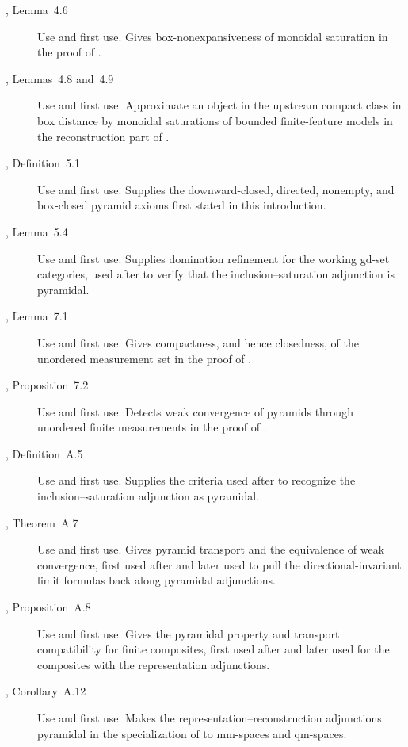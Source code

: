 \documentclass{amsart}
\theoremstyle{plain}
\theoremstyle{definition}
\theoremstyle{remark}
\begin{document}
\begin{description}
\item[\cite{gds2}, Lemma~4.6]
\textup{Use and first use.} Gives box-nonexpansiveness of monoidal saturation
in the proof of .

\item[\cite{gds2}, Lemmas~4.8 and~4.9]
\textup{Use and first use.} Approximate an object in the upstream compact
class in box distance by monoidal saturations of bounded finite-feature
models in the reconstruction part of
.

\item[\cite{gds2}, Definition~5.1]
\textup{Use and first use.} Supplies the downward-closed, directed,
nonempty, and box-closed pyramid axioms first stated in this introduction.

\item[\cite{gds2}, Lemma~5.4]
\textup{Use and first use.} Supplies domination refinement for the working
gd-set categories, used after  to verify that the
inclusion--saturation adjunction is pyramidal.

\item[\cite{gds2}, Lemma~7.1]
\textup{Use and first use.} Gives compactness, and hence closedness, of the
unordered measurement set in the proof of
.

\item[\cite{gds2}, Proposition~7.2]
\textup{Use and first use.} Detects weak convergence of pyramids through
unordered finite measurements in the proof of
.

\item[\cite{gds3-ja}, Definition~A.5]
\textup{Use and first use.} Supplies the criteria used after
 to recognize the inclusion--saturation adjunction
as pyramidal.

\item[\cite{gds3-ja}, Theorem~A.7]
\textup{Use and first use.} Gives pyramid transport and the equivalence of
weak convergence, first used after  and later used
to pull the directional-invariant limit formulas back along pyramidal
adjunctions.

\item[\cite{gds3-ja}, Proposition~A.8]
\textup{Use and first use.} Gives the pyramidal property and transport
compatibility for finite composites, first used after
 and later used for the composites with the
representation adjunctions.

\item[\cite{gds3-ja}, Corollary~A.12]
\textup{Use and first use.} Makes the representation--reconstruction
adjunctions pyramidal in the specialization of
 to mm-spaces and qm-spaces.
\end{description}
\endgroup
\end{document}
